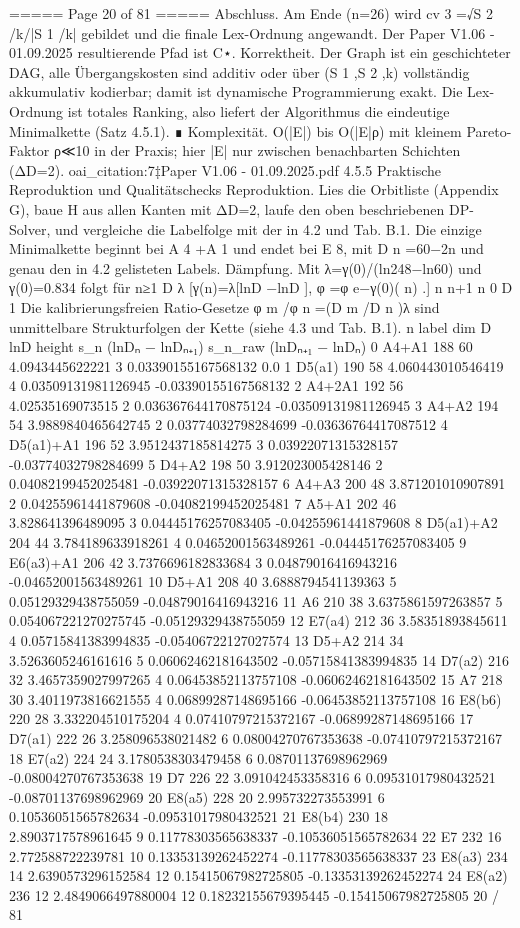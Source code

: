 \begin{MyVerbatim}
===== Page 20 of 81 =====
Abschluss. Am Ende (n=26) wird cv 3 =√S 2 /k/|S 1 /k| gebildet und die finale Lex-Ordnung angewandt. Der
Paper V1.06 - 01.09.2025
resultierende Pfad ist C⋆.
Korrektheit. Der Graph ist ein geschichteter DAG, alle Übergangskosten sind additiv oder über (S 1 ,S 2 ,k) vollständig
akkumulativ kodierbar; damit ist dynamische Programmierung exakt. Die Lex-Ordnung ist totales Ranking, also liefert der
Algorithmus die eindeutige Minimalkette (Satz 4.5.1). ∎
Komplexität. O(|E|) bis O(|E|ρ) mit kleinem Pareto-Faktor ρ≪10 in der Praxis; hier |E| nur zwischen benachbarten
Schichten (ΔD=2). oai_citation:7‡Paper V1.06 - 01.09.2025.pdf
4.5.5 Praktische Reproduktion und Qualitätschecks
Reproduktion. Lies die Orbitliste (Appendix G), baue H aus allen Kanten mit ΔD=2, laufe den oben beschriebenen
DP-Solver, und vergleiche die Labelfolge mit der in 4.2 und Tab. B.1. Die einzige Minimalkette beginnt bei A 4 +A 1 und
endet bei E 8, mit D n =60−2n und genau den in 4.2 gelisteten Labels.
Dämpfung. Mit λ=γ(0)/(ln248−ln60) und γ(0)=0.834 folgt für n≥1
D λ
[γ(n)=λ[lnD −lnD ], φ =φ e−γ(0)( n) .]
n n+1 n 0 D
1
Die kalibrierungsfreien Ratio-Gesetze φ m /φ n =(D m /D n )λ sind unmittelbare Strukturfolgen der Kette (siehe 4.3 und
Tab. B.1).
n label dim D lnD height s_n (lnDₙ − lnDₙ₊₁) s_n_raw (lnDₙ₊₁ − lnDₙ)
0 A4+A1 188 60 4.0943445622221 3 0.03390155167568132 0.0
1 D5(a1) 190 58 4.060443010546419 4 0.03509131981126945 -0.03390155167568132
2 A4+2A1 192 56 4.02535169073515 2 0.036367644170875124 -0.03509131981126945
3 A4+A2 194 54 3.9889840465642745 2 0.03774032798284699 -0.03636764417087512
4 D5(a1)+A1 196 52 3.9512437185814275 3 0.03922071315328157 -0.03774032798284699
5 D4+A2 198 50 3.912023005428146 2 0.04082199452025481 -0.03922071315328157
6 A4+A3 200 48 3.871201010907891 2 0.04255961441879608 -0.04082199452025481
7 A5+A1 202 46 3.828641396489095 3 0.04445176257083405 -0.04255961441879608
8 D5(a1)+A2 204 44 3.784189633918261 4 0.04652001563489261 -0.04445176257083405
9 E6(a3)+A1 206 42 3.7376696182833684 3 0.04879016416943216 -0.04652001563489261
10 D5+A1 208 40 3.6888794541139363 5 0.05129329438755059 -0.04879016416943216
11 A6 210 38 3.6375861597263857 5 0.054067221270275745 -0.05129329438755059
12 E7(a4) 212 36 3.58351893845611 4 0.05715841383994835 -0.05406722127027574
13 D5+A2 214 34 3.5263605246161616 5 0.06062462181643502 -0.05715841383994835
14 D7(a2) 216 32 3.4657359027997265 4 0.06453852113757108 -0.06062462181643502
15 A7 218 30 3.4011973816621555 4 0.06899287148695166 -0.06453852113757108
16 E8(b6) 220 28 3.332204510175204 4 0.07410797215372167 -0.06899287148695166
17 D7(a1) 222 26 3.258096538021482 6 0.08004270767353638 -0.07410797215372167
18 E7(a2) 224 24 3.1780538303479458 6 0.08701137698962969 -0.08004270767353638
19 D7 226 22 3.091042453358316 6 0.09531017980432521 -0.08701137698962969
20 E8(a5) 228 20 2.995732273553991 6 0.10536051565782634 -0.09531017980432521
21 E8(b4) 230 18 2.8903717578961645 9 0.11778303565638337 -0.10536051565782634
22 E7 232 16 2.772588722239781 10 0.13353139262452274 -0.11778303565638337
23 E8(a3) 234 14 2.6390573296152584 12 0.15415067982725805 -0.13353139262452274
24 E8(a2) 236 12 2.4849066497880004 12 0.18232155679395445 -0.15415067982725805
20 / 81


\end{MyVerbatim}
